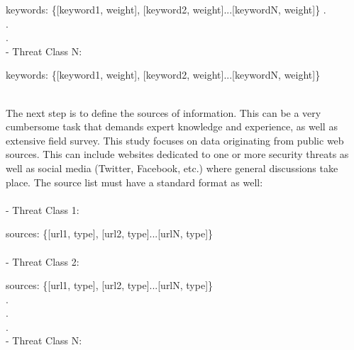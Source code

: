 \documentclass[12pt]{article}
\begin{document}
keywords: \{[keyword1, weight], [keyword2, weight]...[keywordN, weight]\}
.\\
.\\
.\\
- Threat Class N:

keywords: \{[keyword1, weight], [keyword2, weight]...[keywordN, weight]\}
 
\hfill \break \\
The next step is to define the sources of information. This can be a very cumbersome task that demands expert knowledge and experience, as well as extensive field survey. This study focuses on data originating from public web sources. This can include websites dedicated to one or more security threats as well as social media (Twitter, Facebook, etc.) where general discussions take place. The source list must have a standard format as well:\\\\
- Threat Class 1:

sources: \{[url1, type], [url2, type]...[urlN, type]\}\\\\
- Threat Class 2:

sources: \{[url1, type], [url2, type]...[urlN, type]\}\\
.\\
.\\
.\\
- Threat Class N:
\end{document}
